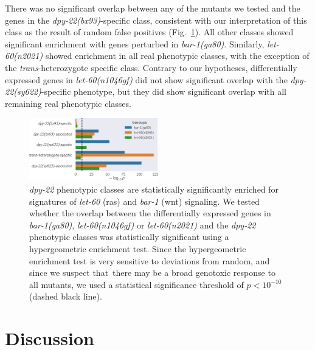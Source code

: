 \documentclass[9pt,twocolumn,twoside]{gsajnl}
\newcommand{\gene}[1]{\mbox{\emph{#1}}}
\newcommand{\dpy}[1]{\gene{dpy-22#1}}
\newcommand{\bx}{\dpy{(bx93)}}
\newcommand{\sy}{\dpy{(sy622)}}
\begin{document}
There was no significant overlap between any of the mutants we tested and the
genes in the \bx{}-specific class, consistent with our interpretation of this
class as the result of random false positives (Fig.~\ref{fig:wnt_stps}). All
other classes showed significant enrichment with genes perturbed in
\gene{bar-1(ga80)}. Similarly, \gene{let-60(n2021)} showed enrichment in all
real phenotypic classes, with the exception of the \emph{trans}-heterozygote
specific class. Contrary to our hypotheses, differentially expressed genes in
\gene{let-60(n1046gf)} did not show significant overlap with the \sy{}-specific
phenotype, but they did show significant overlap with all remaining real
phenotypic classes.

\begin{figure}
  \includegraphics[width=0.5\textwidth]{../figs/stp_pvals.pdf}
  \caption{
          \dpy{} phenotypic classes are statistically significantly enriched
          for signatures of \gene{let-60} (ras) and \gene{bar-1} (wnt)
          signaling.
          We tested whether the overlap between the differentially expressed
          genes in \gene{bar-1(ga80)}, \gene{let-60(n1046gf)} or
          \gene{let-60(n2021)} and the \dpy{} phenotypic classes was
          statistically significant using a hypergeometric enrichment test.
          Since the hypergeometric enrichment test is very sensitive to
          deviations from random, and since we suspect that there may be a broad
          genotoxic response to all mutants, we used a statistical significance
          threshold of $p < 10^{-10}$ (dashed black line).
  }
\label{fig:wnt_stps}
\end{figure}

\section*{Discussion}
\label{sec:conclusions}
\end{document}
